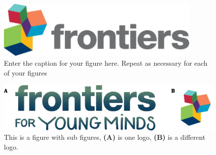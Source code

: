 \documentclass[utf8]{frontiersSCNS} %
\begin{document}
\begin{figure}[h!]
\begin{center}
\includegraphics[width=10cm]{logo1}%
\end{center}
\caption{ Enter the caption for your figure here.  Repeat as  necessary for each of your figures}\label{fig:1}
\end{figure}


\begin{figure}[h!]
\begin{center}
\includegraphics[width=15cm]{logos}
\end{center}
\caption{This is a figure with sub figures, \textbf{(A)} is one logo, \textbf{(B)} is a different logo.}\label{fig:2}
\end{figure}

\end{document}
